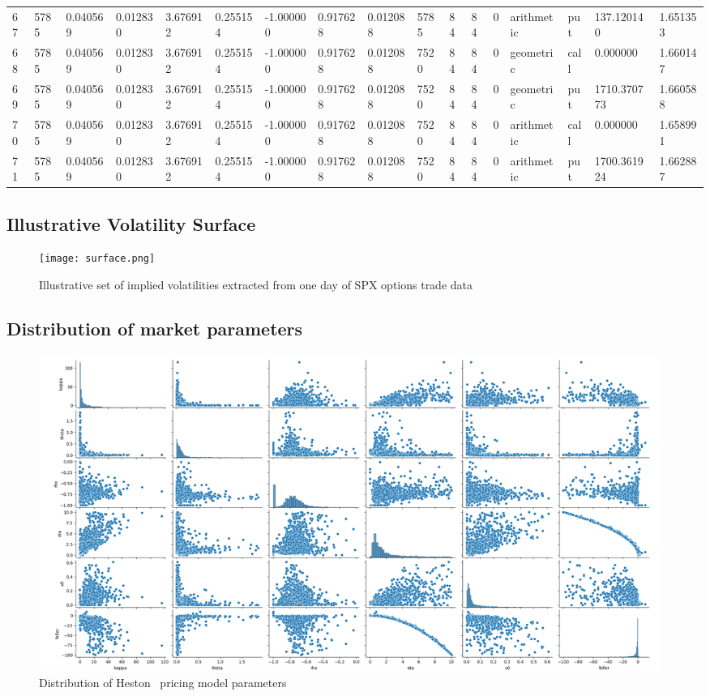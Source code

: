 \begin{table}[ht]
{\begin{tabular}{lllllllllllllllll}
		67 & 5785 & 0.040569 & 0.012830 & 3.676912 & 0.255154 & -1.000000 & 0.917628 & 0.012088 & 5785 & 84 & 84 & 0 & arithmetic & put & 137.120140 & 1.651353 \\
		68 & 5785 & 0.040569 & 0.012830 & 3.676912 & 0.255154 & -1.000000 & 0.917628 & 0.012088 & 7520 & 84 & 84 & 0 & geometric & call & 0.000000 & 1.660147 \\
		69 & 5785 & 0.040569 & 0.012830 & 3.676912 & 0.255154 & -1.000000 & 0.917628 & 0.012088 & 7520 & 84 & 84 & 0 & geometric & put & 1710.370773 & 1.660588 \\
		70 & 5785 & 0.040569 & 0.012830 & 3.676912 & 0.255154 & -1.000000 & 0.917628 & 0.012088 & 7520 & 84 & 84 & 0 & arithmetic & call & 0.000000 & 1.658991 \\
		71 & 5785 & 0.040569 & 0.012830 & 3.676912 & 0.255154 & -1.000000 & 0.917628 & 0.012088 & 7520 & 84 & 84 & 0 & arithmetic & put & 1700.361924 & 1.662887 \\
		\bottomrule
	\end{tabular}
	}
\end{table}
\newpage
\subsection{Illustrative Volatility Surface}
\begin{figure}[h]
	\centering
	\texttt{[image: surface.png]}
	\caption{Illustrative set of implied volatilities extracted from one day of SPX options trade data}
	\label{fig:surface}
\end{figure}
\newpage
\subsection{Distribution of market parameters}
\begin{figure}[h!]
	\includegraphics[width=0.98\textwidth]{market.png}
	\caption{Distribution of Heston~\cite{heston_1993_a} pricing model parameters}
	\label{fig:market}
\end{figure}